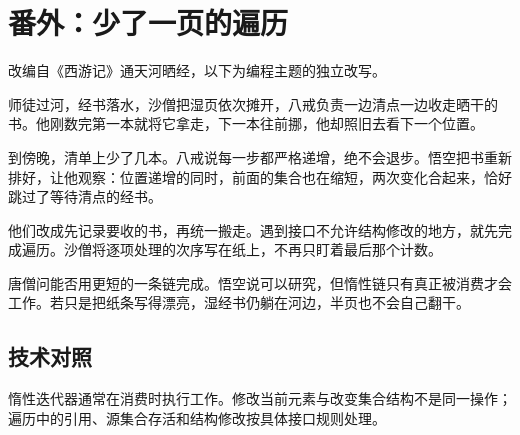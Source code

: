\section{番外：少了一页的遍历}

改编自《西游记》通天河晒经，以下为编程主题的独立改写。

师徒过河，经书落水，沙僧把湿页依次摊开，八戒负责一边清点一边收走晒干的书。他刚数完第一本就将它拿走，下一本往前挪，他却照旧去看下一个位置。

到傍晚，清单上少了几本。八戒说每一步都严格递增，绝不会退步。悟空把书重新排好，让他观察：位置递增的同时，前面的集合也在缩短，两次变化合起来，恰好跳过了等待清点的经书。

他们改成先记录要收的书，再统一搬走。遇到接口不允许结构修改的地方，就先完成遍历。沙僧将逐项处理的次序写在纸上，不再只盯着最后那个计数。

唐僧问能否用更短的一条链完成。悟空说可以研究，但惰性链只有真正被消费才会工作。若只是把纸条写得漂亮，湿经书仍躺在河边，半页也不会自己翻干。

\subsection*{技术对照}

惰性迭代器通常在消费时执行工作。修改当前元素与改变集合结构不是同一操作；遍历中的引用、源集合存活和结构修改按具体接口规则处理。
